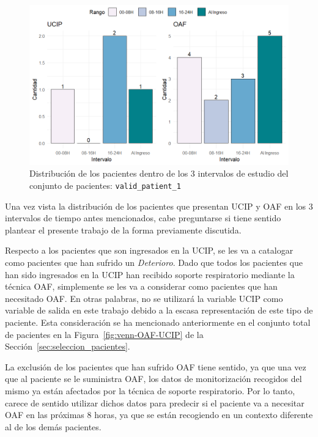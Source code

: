 \begin{figure}[H]
    \centering
    \includegraphics[scale = 0.9]{./img/intervalos-valid-1.png}
    \caption{Distribución de los pacientes dentro de los $3$ intervalos de estudio del conjunto de pacientes: \texttt{valid\_patient\_1}}
    \label{fig:intervalos-valid-1}
\end{figure}


Una vez vista la distribución de los pacientes que presentan UCIP y OAF en los $3$ intervalos de tiempo antes mencionados, cabe preguntarse si tiene sentido plantear el presente trabajo de la forma previamente discutida.

Respecto a los pacientes que son ingresados en la UCIP, se les va a catalogar como pacientes que han sufrido un \textit{Deterioro}. Dado que todos los pacientes que han sido ingresados en la UCIP han recibido soporte respiratorio mediante la técnica OAF, simplemente se les va a considerar como pacientes que han necesitado OAF. En otras palabras, no se utilizará la variable UCIP como variable de salida en este trabajo debido a la escasa representación de este tipo de paciente. Esta consideración se ha mencionado anteriormente en el conjunto total de pacientes en la Figura~\ref{fig:venn-OAF-UCIP} de la Sección~\ref{sec:seleccion_pacientes}.

La exclusión de los pacientes que han sufrido OAF tiene sentido, ya que una vez que al paciente se le suministra OAF, los datos de monitorización recogidos del mismo ya están afectados por la técnica de soporte respiratorio. Por lo tanto, carece de sentido utilizar dichos datos para predecir si el paciente va a necesitar OAF en las próximas $8$ horas, ya que se están recogiendo en un contexto diferente al de los demás pacientes.

